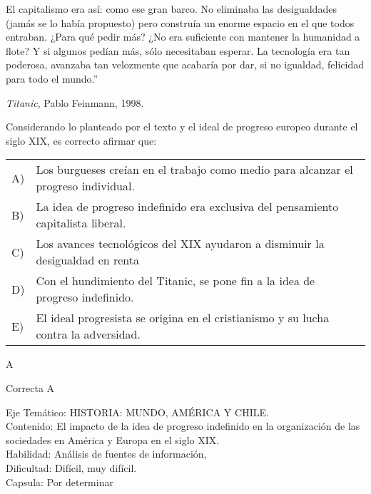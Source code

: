 \documentclass[letterpaper,11pt]{article}
\newcommand{\anchopregunta}{0.9\textwidth}
\begin{document}
\begin{enumerate}
\begin{minipage}{\anchopregunta}
El capitalismo era así: como ese gran barco. No eliminaba las desigualdades (jamás se lo había propuesto) pero construía un enorme espacio en el que todos entraban. ¿Para qué pedir más? ¿No era suficiente con mantener la humanidad a flote? Y si algunos pedían más, sólo necesitaban esperar. La tecnología era tan poderosa, avanzaba tan velozmente que acabaría por dar, si no igualdad, felicidad para todo el mundo.''\\
\begin{flushright}
\textit{Titanic},  Pablo Feinmann, 1998.
\end{flushright}
Considerando lo planteado por el texto y el ideal de progreso europeo durante el siglo XIX, es correcto afirmar que:
\begin{flushleft}\begin{tabular}{@{\hspace{-.001\textwidth}}l@{\hspace{2pt}}p{}}
A)& Los burgueses creían en el trabajo como medio para alcanzar el progreso individual.\\
B)& La idea de progreso indefinido era exclusiva del pensamiento capitalista liberal.\\
C)& Los avances tecnológicos del XIX ayudaron a disminuir la desigualdad en renta\\
D)& Con el hundimiento del Titanic, se pone fin a la idea de progreso indefinido.\\
E)& El ideal progresista se origina en el cristianismo y su lucha contra la adversidad.\\ 
\end{tabular}\end{flushleft}%
\begin{key} A
\end{key} 
\begin{hint}
\end{hint}
\begin{answer} Correcta A \\
\end{answer}
\begin{info} %
\begin{flushleft}
Eje Temático: HISTORIA: MUNDO, AMÉRICA Y CHILE.\\
Contenido: El impacto de la idea de progreso indefinido en la organización de las sociedades en América y Europa en el siglo XIX. \\
Habilidad: Análisis de fuentes de información,\\
Dificultad: Difícil, muy difícil.\\
Capsula: Por determinar \\
\end{flushleft} 
\end{info}
\end{minipage}\vfill$\;$ %


\end{enumerate}
\end{document}

